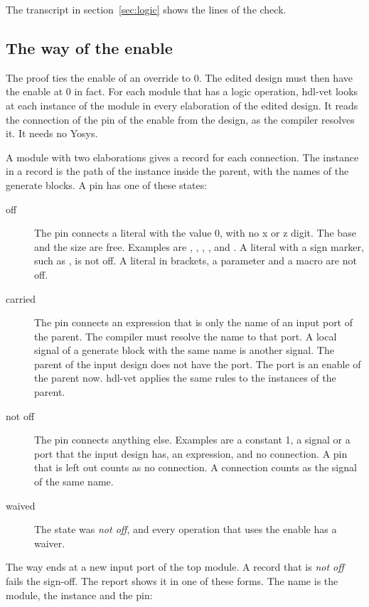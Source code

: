 The transcript in section~\ref{sec:logic} shows the lines of the check.

\subsection*{The way of the enable}
\label{sec:enable}

The proof ties the enable of an override to 0. The edited design must then have the enable
at 0 in fact. For each module that has a logic operation, hdl-vet looks at each instance of
the module in every elaboration of the edited design. It reads the connection of the pin of
the enable from the design, as the compiler resolves it. It needs no Yosys.

A module with two elaborations gives a record for each connection. The instance in a record is the path of
the instance inside the parent, with the names of the generate blocks. A pin has one of
these states:

\begin{description}
\item[off] The pin connects a literal with the value 0, with no x or z digit. The base and
  the size are free. Examples are , , , ,
   and . A literal with a sign marker, such as , is not off.
  A literal in brackets, a parameter and a macro are not off.
\item[carried] The pin connects an expression that is only the name of an input port of
  the parent. The compiler must resolve the name to that port. A local signal of a generate
  block with the same name is another signal. The parent of the input design does not have the
  port. The port is an enable of the parent now. hdl-vet applies the same rules to the
  instances of the parent.
\item[not off] The pin connects anything else. Examples are a constant 1, a signal or a
  port that the input design has, an expression, and no connection. A pin that is left out
  counts as no connection. A  connection counts as the signal of the same name.
\item[waived] The state was \emph{not off}, and every operation that uses the enable has a
  waiver.
\end{description}

The way ends at a new input port of the top module. A record that is \emph{not off} fails
the sign-off. The report shows it in one of these forms. The name is the module, the
instance and the pin:

